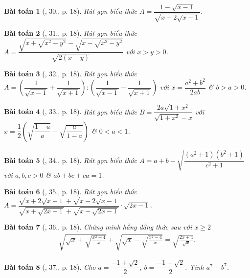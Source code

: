 \documentclass{article}
\newtheorem{baitoan}{Bài toán}
\begin{document}
\begin{baitoan}[\cite{Binh_Toan_9_tap_1}, 30., p. 18]
	Rút gọn biểu thức $A = \dfrac{1 - \sqrt{x - 1}}{\sqrt{x - 2\sqrt{x - 1}}}$.
\end{baitoan}

\begin{baitoan}[\cite{Binh_Toan_9_tap_1}, 31., p. 18]
	Rút gọn biểu thức $A = \dfrac{\sqrt{x + \sqrt{x^2 - y^2}} - \sqrt{x - \sqrt{x^2 - y^2}}}{\sqrt{2(x - y)}}$ với $x > y > 0$.
\end{baitoan}

\begin{baitoan}[\cite{Binh_Toan_9_tap_1}, 32., p. 18]
	Rút gọn biểu thức $A = \left(\dfrac{1}{\sqrt{x - 1}} + \dfrac{1}{\sqrt{x + 1}}\right):\left(\dfrac{1}{\sqrt{x - 1}} - \dfrac{1}{\sqrt{x + 1}}\right)$ với $x = \dfrac{a^2 + b^2}{2ab}$ \& $b > a > 0$.
\end{baitoan}

\begin{baitoan}[\cite{Binh_Toan_9_tap_1}, 33., p. 18]
	Rút gọn biểu thức $B = \dfrac{2a\sqrt{1 + x^2}}{\sqrt{1 + x^2} - x}$ với $x = \dfrac{1}{2}\left(\sqrt{\dfrac{1 - a}{a}} - \sqrt{\dfrac{a}{1 - a}}\right)$ \& $0 < a < 1$.
\end{baitoan}

\begin{baitoan}[\cite{Binh_Toan_9_tap_1}, 34., p. 18]
	Rút gọn biểu thức $A = a + b - \sqrt{\dfrac{(a^2 + 1)(b^2 + 1)}{c^2 + 1}}$ với $a,b,c > 0$ \& $ab + bc + ca = 1$.
\end{baitoan}

\begin{baitoan}[\cite{Binh_Toan_9_tap_1}, 35., p. 18]
	Rút gọn biểu thức $A = \dfrac{\sqrt{x + 2\sqrt{x - 1}} + \sqrt{x - 2\sqrt{x - 1}}}{\sqrt{x + \sqrt{2x - 1}} + \sqrt{x - \sqrt{2x - 1}}}\cdot\sqrt{2x - 1}$.
\end{baitoan}

\begin{baitoan}[\cite{Binh_Toan_9_tap_1}, 36., p. 18]
	Chứng minh hằng đẳng thức sau với $x\ge2$
	\begin{align*}
		\sqrt{\sqrt{x} + \sqrt{\frac{x^2 - 4}{x}}} + \sqrt{\sqrt{x} - \sqrt{\frac{x^2 - 4}{x}}} = \sqrt{\frac{2x + 4}{\sqrt{x}}}.
	\end{align*}
\end{baitoan}

\begin{baitoan}[\cite{Binh_Toan_9_tap_1}, 37., p. 18]
	Cho $a = \dfrac{-1 + \sqrt{2}}{2}$, $b = \dfrac{-1 - \sqrt{2}}{2}$. Tính $a^7 + b^7$.
\end{baitoan}
\end{document}
